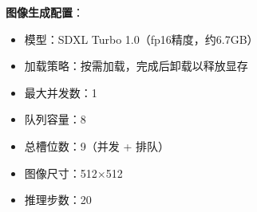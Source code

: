 \textbf{图像生成配置}：
\begin{itemize}
\item 模型：SDXL Turbo 1.0（fp16精度，约6.7GB）
\item 加载策略：按需加载，完成后卸载以释放显存
\item 最大并发数：1
\item 队列容量：8
\item 总槽位数：9（并发 + 排队）
\item 图像尺寸：512$\times$512
\item 推理步数：20
\end{itemize}
